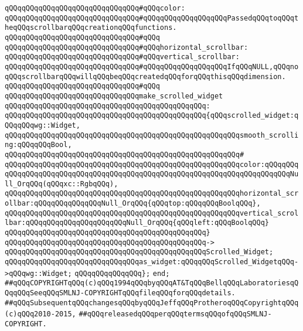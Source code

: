 \verb|qQQqqQQqqQQqqQQqqQQqqQQqqQQqqQQq#qQQqcolor:|\newline
\verb|qQQqqQQqqQQqqQQqqQQqqQQqqQQqqQQq#qQQqqQQqqQQqqQQqqQQqPassedqQQqtoqQQqtheqQQqscrollbarqQQqcreationqQQqfunctions.|\newline
\verb|qQQqqQQqqQQqqQQqqQQqqQQqqQQqqQQq#qQQq|\newline
\verb|qQQqqQQqqQQqqQQqqQQqqQQqqQQqqQQq#qQQqhorizontal_scrollbar:|\newline
\verb|qQQqqQQqqQQqqQQqqQQqqQQqqQQqqQQq#qQQqvertical_scrollbar:|\newline
\verb|qQQqqQQqqQQqqQQqqQQqqQQqqQQqqQQq#qQQqqQQqqQQqqQQqqQQqIfqQQqNULL,qQQqnoqQQqscrollbarqQQqwillqQQqbeqQQqcreatedqQQqforqQQqthisqQQqdimension.|\newline
\verb|qQQqqQQqqQQqqQQqqQQqqQQqqQQqqQQq#qQQq|\newline
\verb|qQQqqQQqqQQqqQQqqQQqqQQqqQQqqQQqmake_scrolled_widget|\newline
\verb|qQQqqQQqqQQqqQQqqQQqqQQqqQQqqQQqqQQqqQQqqQQqqQQq:|\newline
\verb|qQQqqQQqqQQqqQQqqQQqqQQqqQQqqQQqqQQqqQQqqQQqqQQq{qQQqscrolled_widget:qQQqqQQqwg::Widget,|\newline
\newline
\verb|qQQqqQQqqQQqqQQqqQQqqQQqqQQqqQQqqQQqqQQqqQQqqQQqqQQqqQQqsmooth_scrolling:qQQqqQQqBool,|\newline
\verb|qQQqqQQqqQQqqQQqqQQqqQQqqQQqqQQqqQQqqQQqqQQqqQQqqQQqqQQq#|\newline
\verb|qQQqqQQqqQQqqQQqqQQqqQQqqQQqqQQqqQQqqQQqqQQqqQQqqQQqqQQqcolor:qQQqqQQqqQQqqQQqqQQqqQQqqQQqqQQqqQQqqQQqqQQqqQQqqQQqqQQqqQQqqQQqqQQqqQQqqQQqNull_OrqQQq(qQQqxc::RgbqQQq),|\newline
\verb|qQQqqQQqqQQqqQQqqQQqqQQqqQQqqQQqqQQqqQQqqQQqqQQqqQQqqQQqhorizontal_scrollbar:qQQqqQQqqQQqqQQqNull_OrqQQq{qQQqtop:qQQqqQQqBoolqQQq},|\newline
\verb|qQQqqQQqqQQqqQQqqQQqqQQqqQQqqQQqqQQqqQQqqQQqqQQqqQQqqQQqvertical_scrollbar:qQQqqQQqqQQqqQQqqQQqqQQqNull_OrqQQq{qQQqleft:qQQqBoolqQQq}|\newline
\verb|qQQqqQQqqQQqqQQqqQQqqQQqqQQqqQQqqQQqqQQqqQQqqQQq}|\newline
\verb|qQQqqQQqqQQqqQQqqQQqqQQqqQQqqQQqqQQqqQQqqQQqqQQq->|\newline
\verb|qQQqqQQqqQQqqQQqqQQqqQQqqQQqqQQqqQQqqQQqqQQqqQQqScrolled_Widget;|\newline
\newline
\verb|qQQqqQQqqQQqqQQqqQQqqQQqqQQqqQQqas_widget:qQQqqQQqScrolled_WidgetqQQq->qQQqwg::Widget;|\newline
\newline
\verb|qQQqqQQqqQQqqQQq};|\newline
\verb|end;|\newline
\newline
\verb|##qQQqCOPYRIGHTqQQq(c)qQQq1994qQQqbyqQQqAT&TqQQqBellqQQqLaboratoriesqQQqqQQqSeeqQQqSMLNJ-COPYRIGHTqQQqfileqQQqforqQQqdetails.|\newline
\verb|##qQQqSubsequentqQQqchangesqQQqbyqQQqJeffqQQqProtheroqQQqCopyrightqQQq(c)qQQq2010-2015,|\newline
\verb|##qQQqreleasedqQQqperqQQqtermsqQQqofqQQqSMLNJ-COPYRIGHT.|\newline


